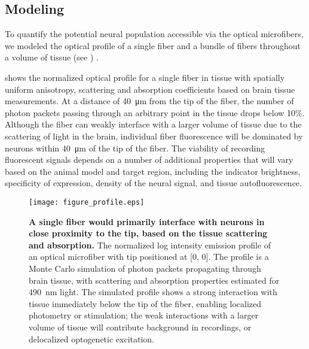 \subsection{Modeling}
\label{sec:histology-modeling}

To quantify the potential neural population accessible via the 
optical microfibers, we modeled the optical profile of a single 
fiber and a bundle of fibers throughout a volume of tissue 
(see ) \cite{Boas:2002ue}.

 shows the normalized optical profile for a single fiber 
in tissue with spatially uniform anisotropy, scattering and 
absorption coefficients based on brain tissue measurements. At 
a distance of 40~\si{\micro\meter} from the tip of the fiber, the number of photon 
packets passing through an arbitrary point 
in the tissue drops below 10\%. Although the fiber can weakly interface with a 
larger volume of tissue due to the scattering of light in the 
brain, individual fiber fluorescence will be dominated 
by neurons within 40~\si{\micro\meter} of the tip of the fiber. The viability of 
recording fluorescent signals depends on a number of additional 
properties that will vary based on the animal model and target 
region, including the indicator brightness, specificity of 
expression, density of the neural signal, and tissue 
autofluorescence.

\begin{figure}
\texttt{[image: figure\_profile.eps]}
\caption[Profile of single fiber.]{\textbf{A single fiber would primarily interface with 
neurons in close proximity to the tip, based on the tissue 
scattering and absorption.} The normalized log intensity 
emission profile of an optical microfiber with tip 
positioned at [0, 0]. The profile is a Monte Carlo 
simulation of photon packets propagating through 
brain tissue, with scattering and absorption properties 
estimated for 490~nm light. The simulated profile shows 
a strong interaction with tissue immediately below the 
tip of the fiber, enabling localized photometry or 
stimulation; the weak interactions with a larger volume 
of tissue will contribute background in recordings, or 
delocalized optogenetic excitation.}
\label{fig:profile}
\end{figure}


